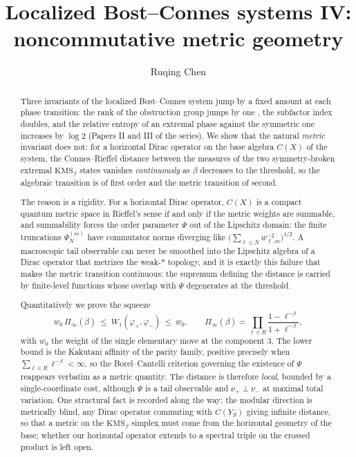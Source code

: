 \documentclass[11pt]{amsart}
\title[Noncommutative metric geometry]{Localized Bost--Connes systems IV:\\ noncommutative metric geometry}
\author{Ruqing Chen}
\date{}
\numberwithin{equation}{section}
\theoremstyle{definition}
\theoremstyle{remark}
\begin{document}
\begin{abstract}
Three invariants of the localized Bost--Connes system jump by a fixed amount at each phase
transition: the rank of the obstruction group jumps by one \cite{SeriesI}, the
subfactor index doubles, and the relative entropy of an extremal phase against the
symmetric one increases by $\log2$ (Papers II and III of the series). We show that the
natural \emph{metric} invariant does not: for a horizontal Dirac operator on the base
algebra $C(X)$ of the system, the Connes--Rieffel distance between the measures of the two
symmetry-broken extremal $\mathrm{KMS}_\beta$ states vanishes \emph{continuously} as $\beta$
decreases to the threshold, so the algebraic transition is of first order and the metric
transition of second.

The reason is a rigidity. For a horizontal Dirac operator, $C(X)$ is a compact quantum
metric space in Rieffel's sense if and only if the metric weights are summable, and
summability forces the order parameter $\Psi$ out of the Lipschitz domain: the finite
truncations $\Psi^{(m)}_N$ have commutator norms diverging like
$\bigl(\sum_{\ell\le N}w_{\ell,m}^{-2}\bigr)^{1/2}$. A macroscopic tail observable can never
be smoothed into the Lipschitz algebra of a Dirac operator that metrizes the weak-$*$
topology, and it is exactly this failure that makes the metric transition continuous: the
supremum defining the distance is carried by finite-level functions whose overlap with
$\Psi$ degenerates at the threshold.

Quantitatively we prove the squeeze
\[
w_0\,\Pi_\infty(\beta)\ \le\ W_1(\varphi_+,\varphi_-)\ \le\ w_0,
\qquad
\Pi_\infty(\beta)=\prod_{\ell\in R}\frac{1-\ell^{-\beta}}{1+\ell^{-\beta}},
\]
with $w_0$ the weight of the single elementary move at the component $3$. The lower bound is
the Kakutani affinity of the parity family, positive precisely when
$\sum_{\ell\in R}\ell^{-\beta}<\infty$, so the Borel--Cantelli criterion governing the
existence of $\Psi$ reappears verbatim as a metric quantity. The distance is therefore
\emph{local}, bounded by a single-coordinate cost, although $\Psi$ is a tail observable and
$\nu_+\perp\nu_-$ at maximal total variation. One structural fact is recorded along the
way: the modular direction is metrically blind, any Dirac operator commuting with $C(Y_S)$
giving infinite distance, so that a metric on the $\mathrm{KMS}_\beta$ simplex must come
from the horizontal geometry of the base; whether our horizontal operator extends to a
spectral triple on the crossed product is left open.
\end{abstract}
\end{document}
